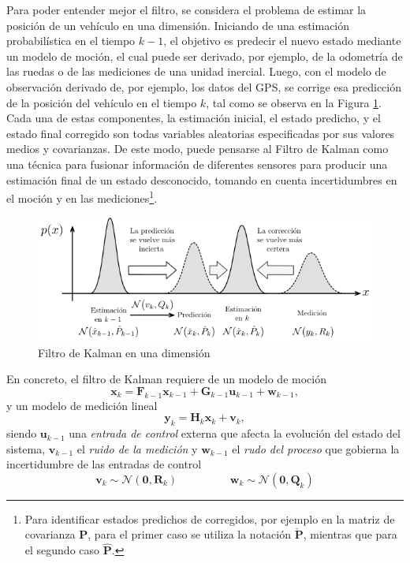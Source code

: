 Para poder entender mejor el filtro, se considera el problema de estimar la posición de un vehículo en una dimensión. Iniciando de una estimación probabilística en el tiempo $k-1$, el objetivo es predecir el nuevo estado mediante un modelo de moción, el cual puede ser derivado, por ejemplo, de la odometría de las ruedas o de las mediciones de una unidad inercial. Luego, con el modelo de observación derivado de, por ejemplo, los datos del GPS, se corrige esa predicción de la posición del vehículo en el tiempo $k$, tal como se observa en la Figura \ref{fig:kalmanfilter}. Cada una de estas componentes, la estimación inicial, el estado predicho, y el estado final corregido son todas variables aleatorias especificadas por sus valores medios y covarianzas. De este modo, puede pensarse al Filtro de Kalman como una técnica para fusionar información de diferentes sensores para producir una estimación final de un estado desconocido, tomando en cuenta incertidumbres en el moción y en las mediciones\footnote{Para identificar estados predichos de corregidos, por ejemplo en la matriz de covarianza $\bm{P}$, para el primer caso se utiliza la notación $\check{\bm{P}}$, mientras que para el segundo caso $\hat{\bm{P}}$.}.

\begin{figure}[!ht]
    \centering
    \includegraphics[width=\textwidth]{Img/KalmanFilter.png}
    \caption{Filtro de Kalman en una dimensión}
    \label{fig:kalmanfilter}
\end{figure}

En concreto, el filtro de Kalman requiere de un modelo de moción
\begin{equation}
    \bm{x}_k = \bm{F}_{k-1}\bm{x}_{k-1} + \bm{G}_{k-1}\bm{u}_{k-1} + \bm{w}_{k-1},
\end{equation}
y un modelo de medición lineal
\begin{equation}
    \bm{y}_k = \bm{H}_k\bm{x}_k + \bm{v}_k,
\end{equation}
siendo $\bm{u}_{k-1}$ una \textit{entrada de control} externa que afecta la evolución del estado del sistema, $\bm{v}_{k-1}$ el \textit{ruido de la medición} y $\bm{w}_{k-1}$ el \textit{rudo del proceso} que gobierna la incertidumbre de las entradas de control
\begin{equation}
    \bm{v}_k \sim \mathcal{N}(\bm{0},\bm{R}_k)\hspace{2cm}\bm{w}_k \sim \mathcal{N}(\bm{0},\bm{Q}_k)
\end{equation}

